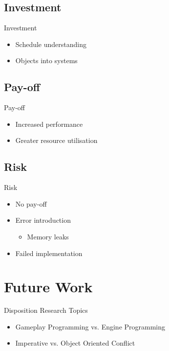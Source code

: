 \subsection{Investment}
\begin{frame}{\secname}{\subsecname}
	Investment
	\begin{itemize}
		\item Schedule understanding
		\item Objects into systems
	\end{itemize}
\end{frame}

\subsection{Pay-off}
\begin{frame}{\secname}{\subsecname}
	Pay-off
	\begin{itemize}
		\item Increased performance
		\item Greater resource utilisation
	\end{itemize}
\end{frame}

\subsection{Risk}
\begin{frame}{\secname}{\subsecname}
	Risk
	\begin{itemize}
		\item No pay-off
		\item Error introduction
		\begin{itemize}
			\item Memory leaks
		\end{itemize}
		\item Failed implementation
	\end{itemize}
\end{frame}

\section{Future Work}
\begin{frame}{\secname}{Disposition}
	Research Topics
	\begin{itemize}
		\item Gameplay Programming vs. Engine Programming
		\item Imperative vs. Object Oriented Conflict
	\end{itemize}
\end{frame}

